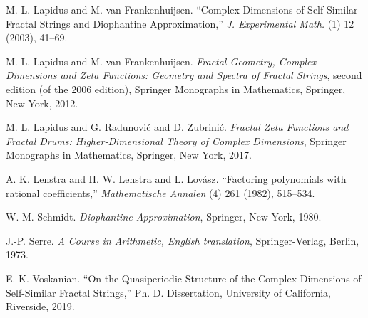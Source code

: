 \documentclass{if-beamer}
\begin{document}
\begin{frame}[allowframebreaks]
\begin{thebibliography}{1}
M. L. Lapidus and M. van Frankenhuijsen.
``Complex Dimensions of Self-Similar Fractal Strings and Diophantine Approximation,''  
\textit{J. Experimental Math.}
(1)
12
(2003),
41--69. 

M. L. Lapidus and M. van Frankenhuijsen.
\textit{Fractal Geometry, Complex Dimensions and Zeta Functions: Geometry and Spectra of Fractal Strings}, second edition (of the 2006 edition),
Springer Monographs in Mathematics, Springer, New York, 2012.

M. L. Lapidus and G. Radunovi\'c and D. {\u Z}ubrini\'c.
\textit{Fractal Zeta Functions and Fractal Drums: Higher-Dimensional Theory of Complex Dimensions},
Springer Monographs in Mathematics, Springer, New York, 2017.

A. K. Lenstra and H. W. Lenstra and L. Lov\'asz.
``Factoring polynomials with rational coefficients,''  
\textit{Mathematische Annalen}
(4)
261
(1982),
515--534. 

W. M. Schmidt.
\textit{Diophantine Approximation},
Springer, New York, 1980.

J.-P. Serre.
\textit{A Course in Arithmetic\textup{, English translation}},
Springer-Verlag, Berlin, 1973.

E. K. Voskanian.
``On the Quasiperiodic Structure of the Complex Dimensions of Self-Similar Fractal Strings,''
Ph. D. Dissertation, University of California, Riverside, 2019.

\end{thebibliography}

\end{frame}
\end{document}
